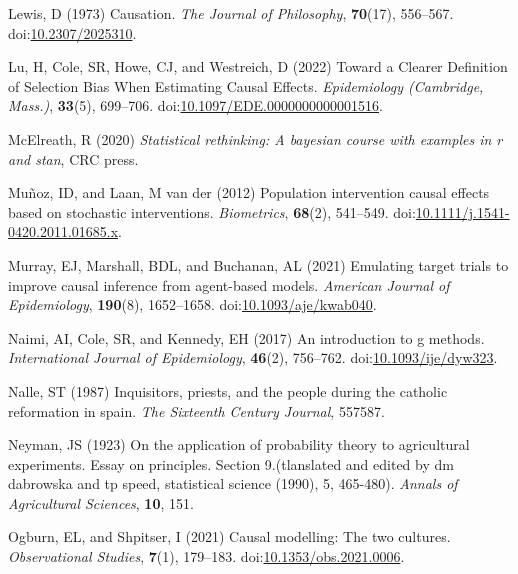 \documentclass[
  singlecolumn,
  9pt]{article}
\begin{document}
\begin{CSLReferences}
Lewis, D (1973) Causation. \emph{The Journal of Philosophy},
\textbf{70}(17), 556--567.
doi:\href{https://doi.org/10.2307/2025310}{10.2307/2025310}.

Lu, H, Cole, SR, Howe, CJ, and Westreich, D (2022) Toward a Clearer
Definition of Selection Bias When Estimating Causal Effects.
\emph{Epidemiology (Cambridge, Mass.)}, \textbf{33}(5), 699--706.
doi:\href{https://doi.org/10.1097/EDE.0000000000001516}{10.1097/EDE.0000000000001516}.

McElreath, R (2020) \emph{Statistical rethinking: A bayesian course with
examples in r and stan}, CRC press.

Muñoz, ID, and Laan, M van der (2012) Population intervention causal
effects based on stochastic interventions. \emph{Biometrics},
\textbf{68}(2), 541--549.
doi:\href{https://doi.org/10.1111/j.1541-0420.2011.01685.x}{10.1111/j.1541-0420.2011.01685.x}.

Murray, EJ, Marshall, BDL, and Buchanan, AL (2021) Emulating target
trials to improve causal inference from agent-based models.
\emph{American Journal of Epidemiology}, \textbf{190}(8), 1652--1658.
doi:\href{https://doi.org/10.1093/aje/kwab040}{10.1093/aje/kwab040}.

Naimi, AI, Cole, SR, and Kennedy, EH (2017) An introduction to g
methods. \emph{International Journal of Epidemiology}, \textbf{46}(2),
756--762.
doi:\href{https://doi.org/10.1093/ije/dyw323}{10.1093/ije/dyw323}.

Nalle, ST (1987) Inquisitors, priests, and the people during the
catholic reformation in spain. \emph{The Sixteenth Century Journal},
557587.

Neyman, JS (1923) On the application of probability theory to
agricultural experiments. Essay on principles. Section 9.(tlanslated and
edited by dm dabrowska and tp speed, statistical science (1990), 5,
465-480). \emph{Annals of Agricultural Sciences}, \textbf{10}, 151.

Ogburn, EL, and Shpitser, I (2021) Causal modelling: The two cultures.
\emph{Observational Studies}, \textbf{7}(1), 179--183.
doi:\href{https://doi.org/10.1353/obs.2021.0006}{10.1353/obs.2021.0006}.


\end{CSLReferences}
\end{document}
